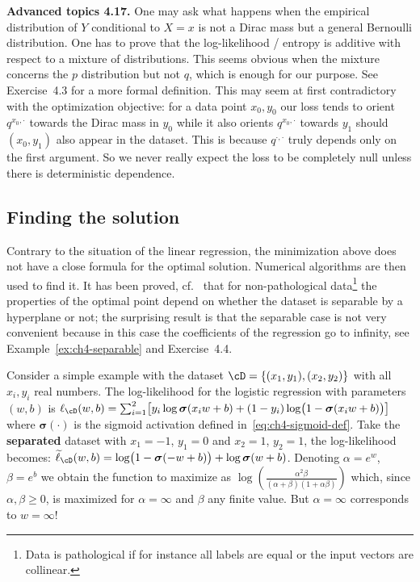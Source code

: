 \begin{tcolorbox}[advancedbox]
\textbf{Advanced topics 4.17.} One may ask what happens when the empirical
distribution of $Y$ conditional to $X = x$ is not a Dirac mass but a general
Bernoulli distribution. One has to prove that the log-likelihood / entropy
is additive with respect to a mixture of distributions. This seems obvious
when the mixture concerns the $p$ distribution but not $q$, which is enough
for our purpose. See Exercise~4.3 for a more formal definition. This
may seem at first contradictory with the optimization objective: for a
data point $x_0, y_0$ our loss tends to orient $q^{x_0, \cdot}$ towards the Dirac mass in
$y_0$ while it also orients $q^{x_0, \cdot}$ towards $y_1$ should $(x_0, y_1)$ also appear in the
dataset. This is because $q^{\cdot, \cdot}$ truly depends only on the first argument.
So we never really expect the loss to be completely null unless there is
deterministic dependence.
\end{tcolorbox}

\subsection{Finding the solution}

Contrary to the situation of the linear regression, the minimization above does
not have a close formula for the optimal solution. Numerical algorithms are
then used to find it. It has been proved, cf.~\cite{turinici1} that for non-pathological data\footnote{Data is pathological if for instance all labels are equal or the input vectors are collinear.}
the properties of the optimal point depend on whether the dataset is separable
by a hyperplane or not; the surprising result is that the separable case is not
very convenient because in this case the coefficients of the regression go to
infinity, see Example~\ref{ex:ch4-separable} and Exercise~4.4.

\begin{example}\label{ex:ch4-separable}
Consider a simple example with the dataset $\cD = \{(x_1, y_1), (x_2, y_2)\}$
with all $x_i, y_i$ real numbers. The log-likelihood for the logistic regression with parameters $(w, b)$ is $\ell_{\cD}(w, b) = \sum_{i=1}^2 \bigl[ y_i \log \boldsymbol{\sigma}(x_i w + b) + (1 - y_i) \log\bigl( 1 - \boldsymbol{\sigma}(x_i w + b) \bigr) \bigr]$ where $\boldsymbol{\sigma}(\cdot)$ is the sigmoid activation defined in~\eqref{eq:ch4-sigmoid-def}.
Take the \textbf{separated} dataset with $x_1 = -1$, $y_1 = 0$ and $x_2 = 1$, $y_2 = 1$, the log-likelihood becomes: $\widetilde{\ell}_{\cD}(w, b) = \log\bigl( 1 - \boldsymbol{\sigma}(-w + b) \bigr) + \log \boldsymbol{\sigma}(w + b)$. Denoting $\alpha = e^w$, $\beta = e^b$ we obtain the function to maximize as $\log\!\left( \frac{\alpha^2 \beta}{(\alpha + \beta)(1 + \alpha \beta)} \right)$ which,
since $\alpha, \beta \ge 0$, is maximized for $\alpha = \infty$ and $\beta$ any finite value. But $\alpha = \infty$
corresponds to $w = \infty$!
\end{example}

